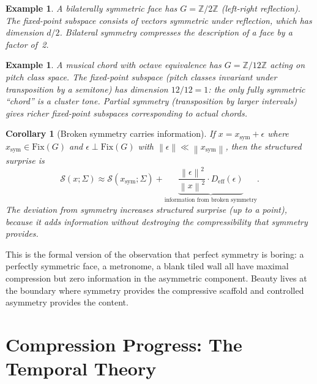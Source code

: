 \documentclass[journal]{IEEEtran}
\newtheorem{corollary}[theorem]{Corollary}
\newtheorem{example}[theorem]{Example}
\newcommand{\norm}[1]{\left\lVert #1 \right\rVert}
\begin{document}
\begin{example}
A bilaterally symmetric face has $G = \mathbb{Z}/2\mathbb{Z}$ (left-right
reflection).  The fixed-point subspace consists of vectors symmetric under
reflection, which has dimension $d/2$.  Bilateral symmetry compresses the
description of a face by a factor of~2.
\end{example}

\begin{example}
A musical chord with octave equivalence has $G = \mathbb{Z}/12\mathbb{Z}$
acting on pitch class space.  The fixed-point subspace (pitch classes
invariant under transposition by a semitone) has dimension $12/12 = 1$:
the only fully symmetric ``chord'' is a cluster tone.  Partial symmetry
(transposition by larger intervals) gives richer fixed-point subspaces
corresponding to actual chords.
\end{example}

\begin{corollary}[Broken symmetry carries information]
\label{cor:broken}
If $x = x_{\mathrm{sym}} + \epsilon$ where $x_{\mathrm{sym}} \in
\mathrm{Fix}(G)$ and $\epsilon \perp \mathrm{Fix}(G)$ with
$\norm{\epsilon} \ll \norm{x_{\mathrm{sym}}}$, then the structured
surprise is
\begin{equation}
    \mathcal{S}(x; \Sigma) \approx \mathcal{S}(x_{\mathrm{sym}};
    \Sigma) + \underbrace{\frac{\norm{\epsilon}^2}{\norm{x}^2}
    \cdot D_{\mathrm{eff}}(\epsilon)}_{\text{information from
    broken symmetry}}.
\end{equation}
The deviation from symmetry \emph{increases} structured surprise
(up to a point), because it adds information without destroying the
compressibility that symmetry provides.
\end{corollary}

This is the formal version of the observation that perfect symmetry
is boring: a perfectly symmetric face, a metronome, a blank tiled
wall all have maximal compression but zero information in the
asymmetric component.  Beauty lives at the boundary where symmetry
provides the compressive scaffold and controlled asymmetry provides
the content.


\section{Compression Progress: The Temporal Theory}
\label{sec:temporal}
\end{document}

